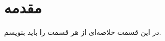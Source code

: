 \setRL
\clearpage
{} 

\def \MemBio {\Mempath /MembraneBio}

\section{
مقدمه
}
در این قسمت خلاصه‌ای از هر قسمت را باید بنویسم.

